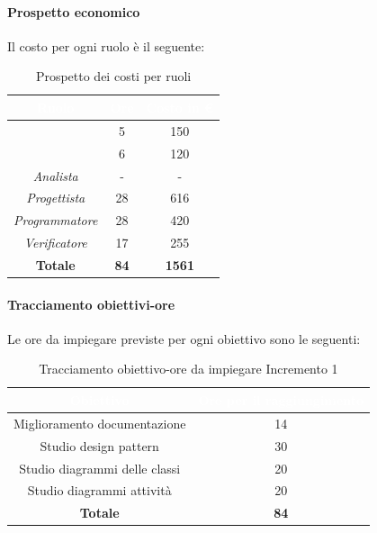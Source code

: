 \paragraph*{Prospetto economico}
Il costo per ogni ruolo è il seguente:
\begin{table}[H]
	\begin{center}
		\begin{tabular}{ |c c c| }
			\rowcolor{darkblue} 
			\textcolor{white}{\textbf{Ruolo}} & \textcolor{white}{\textbf{Ore}} & \textcolor{white}{\textbf{Costo in €}}\\ \hline
		{\Responsabile} 			& 5 	& 150 \\ \hline
		{\Amministratore}		 	& 6 	& 120 \\ \hline
		\textit{Analista} 			& - 	& - \\ \hline
		\textit{Progettista} 		& 28 	& 616 \\ \hline
		\textit{Programmatore}  	& 28 	& 420 \\ \hline
		\textit{Verificatore} 		& 17 	& 255 \\ \hline
		\textbf{Totale} & \textbf{84} & \textbf{1561} \\ \hline
		\end{tabular}
		\caption{Prospetto dei costi per ruoli}
	\end{center}
\end{table}
\paragraph*{Tracciamento obiettivi-ore}
Le ore da impiegare previste per ogni obiettivo sono le seguenti:
\begin{table}[H]
	\begin{center}
		\begin{tabular}{ |c c| }
			\rowcolor{darkblue} 
			\textcolor{white}{\textbf{Obiettivo}}	& \textcolor{white}{\textbf{Ore per il raggiungimento}} \\ \hline
			{Miglioramento documentazione} 			& 14 	\\ \hline
			{Studio design pattern} 				& 30 	\\ \hline
			{Studio diagrammi delle classi} 		& 20 	\\ \hline
			{Studio diagrammi attività} 			& 20 	\\ \hline
			\textbf{Totale} 						& \textbf{84}  \\ \hline
		\end{tabular}
		\caption{Tracciamento obiettivo-ore da impiegare Incremento 1}
	\end{center}
\end{table}
